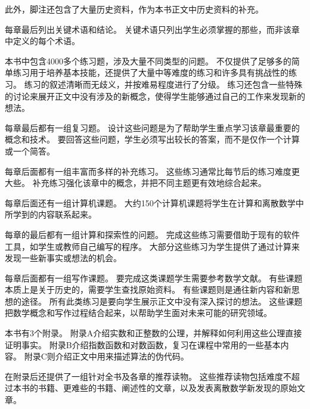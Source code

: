 {{\begin{description}
{                此外，脚注还包含了大量历史资料，作为本书正文中历史资料的补充。
            }
            \item[关键术语和结论]
            {
                每章最后列出关键术语和结论。
                关键术语只列出学生必须掌握的那些，而非该章中定义的每个术语。
            }
            \item[练习]
            {
                本书中包含4000多个练习题，涉及大量不同类型的问题。
                不仅提供了足够多的简单练习用于培养基本技能，还提供了大量中等难度的练习和许多具有挑战性的练习。
                练习的叙述清晰而无歧义，并按难易程度进行了分级。
                练习还包含一些特殊的讨论来展开正文中没有涉及的新概念，使得学生能够通过自己的工作来发现新的想法。
            }
            \item[复习题]
            {
                每章最后都有一组复习题。
                设计这些问题是为了帮助学生重点学习该章最重要的概念和技术。
                要回答这些问题，学生必须写出较长的答案，而不是仅作一个计算或一个简答。
            }
            \item[补充练习]
            {
                每章后面都有一组丰富而多样的补充练习。
                这些练习通常比每节后的练习难度更大些。
                补充练习强化该章中的概念，并把不同主题更有效地综合起来。
            }
            \item[计算机课题]
            {
                每章后面还有一组计算机课题。
                大约150个计算机课题将学生在计算和离散数学中所学到的内容联系起来。
            }
            \item[计算和探索]
            {
                每章的最后都有一组计算和探索性的问题。
                完成这些练习需要借助于现有的软件工具，如学生或教师自己编写的程序。
                大部分这些练习为学生提供了通过计算来发现一些新事实或想法的机会。
            }
            \item[写作课题]
            {
                每章后面都有一组写作课题。
                要完成这类课题学生需要参考数学文献。
                有些课题本质上是关于历史的，需要学生查找原始资料。
                有些课题则是通往新内容和新思想的途径。
                所有此类练习是要向学生展示正文中没有深入探讨的想法。
                这些课题把数学概念和写作过程结合起来，以帮助学生面对未来可能的研究领域。
            }
            \item[附录]
            {
                本书有3个附录。
                附录A介绍实数和正整数的公理，并解释如何利用这些公理直接证明事实。
                附录B介绍指数函数和对数函数，复习在课程中常用的一些基本内容。
                附录C则介绍正文中用来描述算法的伪代码。
            }
            \item[推荐读物]
            {
                在附录后还提供了一组针对全书及各章的推荐读物。
                这些推荐读物包括难度不超过本书的书籍、更难些的书籍、阐述性的文章，以及发表离散数学新发现的原始文章。
            }
        \end{description}
    }
}

\cleardoublepage

\endinput
